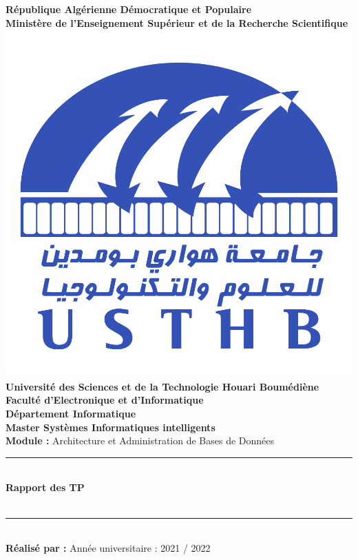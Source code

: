 \documentclass[12pt]{report}
\newcommand{\HRule}{\rule{\linewidth}{0.5mm}}
\begin{document}
    \begin{titlepage}
        \begin{center}
        \textbf{République Algérienne Démocratique et Populaire}\\
        \textbf{Ministère de l'Enseignement Supérieur et de la Recherche Scientifique}\\[1cm]
            
            \includegraphics[scale=0.5]{./ressources/USTHB_Logo.png}\\[1cm]
            
            \large
            \textbf{Université des Sciences et de la Technologie Houari Boumédiène}\\[0.5cm]
            \textbf{Faculté d'Electronique et d'Informatique}\\
            \textbf{Département Informatique}\\[0.5cm]

            \Large
            \textbf{Master Systèmes Informatiques intelligents}\\[0.5cm]
            
            \textbf{Module :} Architecture et Administration de Bases de Données

            \HRule \\[0.4cm]
            \LARGE{\textbf{Rapport des TP}\\
            \textit{}\\[0.4cm]}
            \HRule \\[2cm]
            
            \large
            \textbf{Réalisé par :}
            \vfill
            Année universitaire : 2021 / 2022
        \end{center}
    \end{titlepage}
    \normalsize
\end{document}
